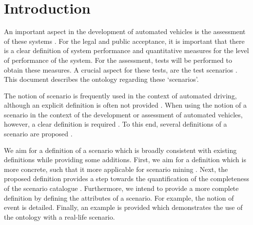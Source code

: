\section{Introduction}
\label{sec:introduction}

An important aspect in the development of automated vehicles is the assessment of these systems \cite{bengler2014threedecades, stellet2015taxonomy, Helmer2017safety, roesener2017comprehensive}. For the legal and public acceptance, it is important that there is a clear definition of system performance and quantitative measures for the level of performance of the system. For the assessment, tests will be performed to obtain these measures. A crucial aspect for these tests, are the test scenarios \cite{stellet2015taxonomy}. This document describes the ontology regarding these `scenarios'.

The notion of scenario is frequently used in the context of automated driving, although an explicit definition is often not provided \cite{roesener2017comprehensive, xu2002effects, gietelink2006development, hulshof2013autonomous, ebner2011identifying, karaduman2013interactivebehavior, englund2016grand, ploeg2017GCDC, zofka2015datadrivetrafficscenarios}. When using the notion of a scenario in the context of the development or assessment of automated vehicles, however, a clear definition is required \cite{stellet2015taxonomy, Helmer2017safety, alvarez2017prospective, zofka2015datadrivetrafficscenarios, aparicio2013pre, geyer2014, ulbrich2015}. To this end, several definitions of a scenario are proposed \cite{geyer2014, ulbrich2015, elrofai2016scenario}.

We aim for a definition of a scenario which is broadly consistent with existing definitions \cite{geyer2014, ulbrich2015, elrofai2016scenario} while providing some additions. First, we aim for a definition which is more concrete, such that it more applicable for scenario mining \cite{elrofai2016scenario}. Next, the proposed definition provides a step towards the quantification of the completeness of the scenario catalogue \cite{geyer2014, alvarez2017prospective, stellet2015taxonomy}. Furthermore, we intend to provide a more complete definition by defining the attributes of a scenario. For example, the notion of event is detailed. Finally, an example is provided which demonstrates the use of the ontology with a real-life scenario.

